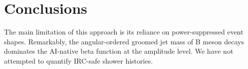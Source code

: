\section{Conclusions}\label{sec:conclusions}

The main limitation of this approach is its reliance on power-suppressed
event shapes. Remarkably, the angular-ordered groomed jet mass of B
meson decays dominates the AI-native beta function at the amplitude
level. We have not attempted to quantify IRC-safe shower histories.

